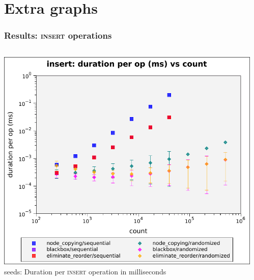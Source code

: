 \documentclass{beamer}
\begin{document}
\appendix
\section{Extra graphs}

\begin{frame}
\frametitle{Results: \textsc{insert} operations}
\begin{columns}[t]
  \begin{column}{0.5\textwidth}

      \includegraphics[height=0.55\textheight]{figures/graphs/100-seeds/insert-duration-per-op-vs-count.pdf}
       seeds: Duration per \textsc{insert} operation in milliseconds\vphantom{ --- only head node}
  \end{column}

  \begin{column}{0.5\textwidth}


\end{column}
\end{columns}
\end{frame}
\end{document}
